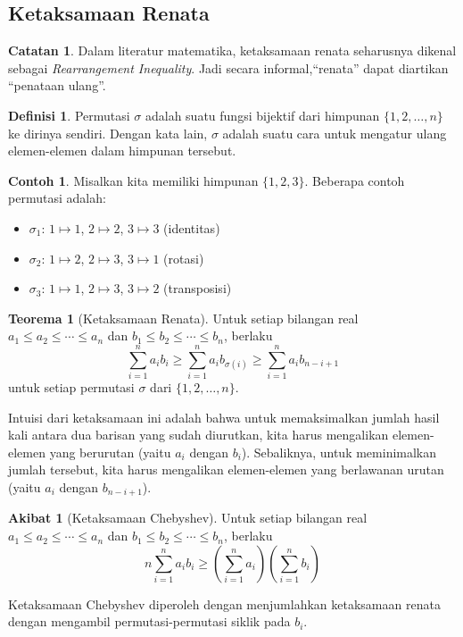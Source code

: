 \documentclass[aspectratio=169]{beamer}
\theoremstyle{definition}
\newtheorem{definisi}{Definisi}
\newtheorem{teorema}{Teorema}
\newtheorem{akibat}{Akibat}
\newtheorem{contoh}{Contoh}
\newtheorem{catatan}{Catatan}
\begin{document}
\subsection{Ketaksamaan Renata}
\begin{frame}{\insertsection}{\insertsubsection}
  \begin{catatan}
    Dalam literatur matematika, ketaksamaan renata seharusnya dikenal sebagai \textit{Rearrangement Inequality}. Jadi secara informal,``renata'' dapat diartikan ``penataan ulang''.
  \end{catatan}
  \begin{definisi}
    Permutasi $\sigma$ adalah suatu fungsi bijektif dari himpunan $\{1, 2, \ldots, n\}$ ke dirinya sendiri. Dengan kata lain, $\sigma$ adalah suatu cara untuk mengatur ulang elemen-elemen dalam himpunan tersebut.
  \end{definisi}
  \begin{contoh}
    Misalkan kita memiliki himpunan $\{1, 2, 3\}$. Beberapa contoh permutasi adalah:
    \begin{itemize}
      \item $\sigma_1$: $1 \mapsto 1$, $2 \mapsto 2$, $3 \mapsto 3$ (identitas)
      \item $\sigma_2$: $1 \mapsto 2$, $2 \mapsto 3$, $3 \mapsto 1$ (rotasi)
      \item $\sigma_3$: $1 \mapsto 1$, $2 \mapsto 3$, $3 \mapsto 2$ (transposisi)
    \end{itemize}
  \end{contoh}
\end{frame}
\begin{frame}{\insertsection}{\insertsubsection}
  \begin{teorema}[Ketaksamaan Renata\label{thm:renata}]
    Untuk setiap bilangan real $a_1 \leq a_2 \leq \cdots \leq a_n$ dan $b_1 \leq b_2 \leq \cdots \leq b_n$, berlaku
    \[
      \sum_{i=1}^n a_i b_i \geq \sum_{i=1}^n a_i b_{\sigma(i)} \geq \sum_{i=1}^n a_i b_{n-i+1}
    \]
    untuk setiap permutasi $\sigma$ dari $\{1, 2, \ldots, n\}$.
  \end{teorema}
  Intuisi dari ketaksamaan ini adalah bahwa untuk memaksimalkan jumlah hasil kali antara dua barisan yang sudah diurutkan, kita harus mengalikan elemen-elemen yang berurutan (yaitu $a_i$ dengan $b_i$). Sebaliknya, untuk meminimalkan jumlah tersebut, kita harus mengalikan elemen-elemen yang berlawanan urutan (yaitu $a_i$ dengan $b_{n-i+1}$).
\end{frame}
\begin{frame}{\insertsection}{\insertsubsection}
  \begin{akibat}[Ketaksamaan Chebyshev]
    Untuk setiap bilangan real $a_1 \leq a_2 \leq \cdots \leq a_n$ dan $b_1 \leq b_2 \leq \cdots \leq b_n$, berlaku
    \[n\sum_{i=1}^n a_i b_i \geq \left(\sum_{i=1}^n a_i\right)\left(\sum_{i=1}^n b_i\right)\]
  \end{akibat}
  Ketaksamaan Chebyshev diperoleh dengan menjumlahkan ketaksamaan renata dengan mengambil permutasi-permutasi siklik pada $b_i$.
\end{frame}
\end{document}
